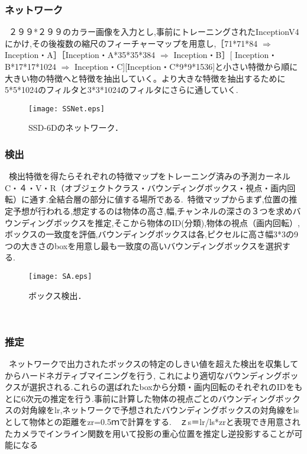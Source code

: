 \documentclass[11pt,a4j,ascmac]{jarticle}
\begin{document}
\subsubsection{ネットワーク}
\  ２９９*２９９のカラー画像を入力とし,事前にトレーニングされたInceptionV4にかけ,その後複数の縮尺のフィーチャーマップを用意し,［71*71*84 $\Rightarrow$  Inception・A］［Inception・A*35*35*384 $\Rightarrow$ Inception・B］[ Inception・B*17*17*1024 $\Rightarrow$ Inception・C][Inception・C*9*9*1536]と小さい特徴から順に大きい物の特徴へと特徴を抽出していく。より大きな特徴を抽出するために5*5*1024のフィルタと3*3*1024のフィルタにさらに通していく.\ 
    \begin{figure}[htpp]
     \centering
      \texttt{[image: SSNet.eps]}
      \vspace*{25mm}
      \caption{SSD-6Dのネットワーク．}
      \label{SSD-6Dのネットワーク}
    \end{figure}


\subsubsection{検出}

\  検出特徴を得たらそれぞれの特徴マップをトレーニング済みの予測カーネルC・４・V・R（オブジェクトクラス・バウンディングボックス・視点・画内回転）に通す.全結合層の部分に値する場所である.\ 
 特徴マップからまず,位置の推定予想が行われる,想定するのは物体の高さ,幅,チャンネルの深さの３つを求めバウンディングボックスを推定,そこから物体のID(分類),物体の視点（画内回転）,ボックスの一致度を評価,バウンディングボックスは各,ピクセルに高さ幅3*3の9つの大きさのboxを用意し最も一致度の高いバウンディングボックスを選択する.\ 
    \begin{figure}[htpp]
      \centering
      \texttt{[image: SA.eps]}
      \vspace*{25mm}
      \caption{ボックス検出．}
      \label{ボックス検出}
    \end{figure}\ 



\subsubsection{推定}
\  ネットワークで出力されたボックスの特定のしきい値を超えた検出を収集してからハードネガティブマイニングを行う,
これにより適切なバウンディングボックスが選択される.これらの選ばれたboxから分類・画内回転のそれぞれのIDをもとに6次元の推定を行う.事前に計算した物体の視点ごとのバウンディングボックスの対角線をlr,ネットワークで予想されたバウンディングボックスの対角線をlsとして物体との距離をzr=0.5ｍで計算をする.　ｚs＝lr/ls*zrと表現でき用意されたカメラでインライン関数を用いて投影の重心位置を推定し逆投影することが可能になる\ 
\end{document}
